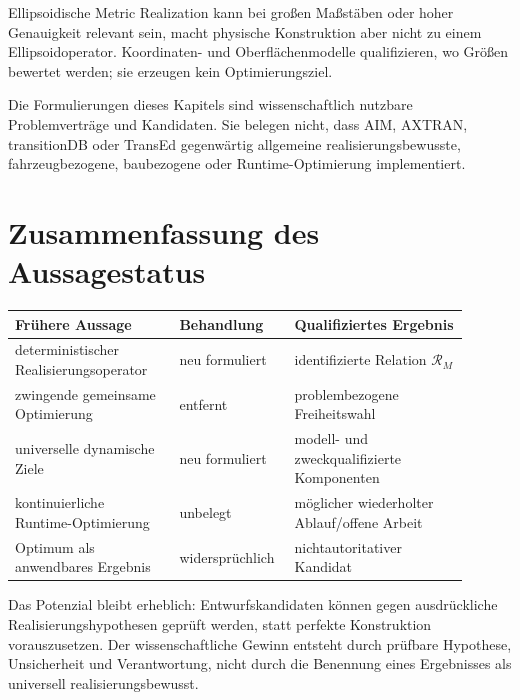 Ellipsoidische Metric Realization kann bei großen Maßstäben oder hoher
Genauigkeit relevant sein, macht physische Konstruktion aber nicht zu einem
Ellipsoidoperator. Koordinaten- und Oberflächenmodelle qualifizieren, wo Größen
bewertet werden; sie erzeugen kein Optimierungsziel.

Die Formulierungen dieses Kapitels sind wissenschaftlich nutzbare
Problemverträge und Kandidaten. Sie belegen nicht, dass AIM, AXTRAN,
transitionDB oder TransEd gegenwärtig allgemeine realisierungsbewusste,
fahrzeugbezogene, baubezogene oder Runtime-Optimierung implementiert.

\section{Zusammenfassung des Aussagestatus}

\begin{center}
\small
\begin{tabular}{p{0.34\linewidth}p{0.20\linewidth}p{0.36\linewidth}}
\toprule
Frühere Aussage & Behandlung & Qualifiziertes Ergebnis\\
\midrule
deterministischer Realisierungsoperator & neu formuliert & identifizierte Relation \(\mathcal R_M\)\\
zwingende gemeinsame Optimierung & entfernt & problembezogene Freiheitswahl\\
universelle dynamische Ziele & neu formuliert & modell- und zweckqualifizierte Komponenten\\
kontinuierliche Runtime-Optimierung & unbelegt & möglicher wiederholter Ablauf/offene Arbeit\\
Optimum als anwendbares Ergebnis & widersprüchlich & nichtautoritativer Kandidat\\
\bottomrule
\end{tabular}
\end{center}

Das Potenzial bleibt erheblich: Entwurfskandidaten können gegen ausdrückliche
Realisierungshypothesen geprüft werden, statt perfekte Konstruktion
vorauszusetzen. Der wissenschaftliche Gewinn entsteht durch prüfbare
Hypothese, Unsicherheit und Verantwortung, nicht durch die Benennung eines
Ergebnisses als universell realisierungsbewusst.
